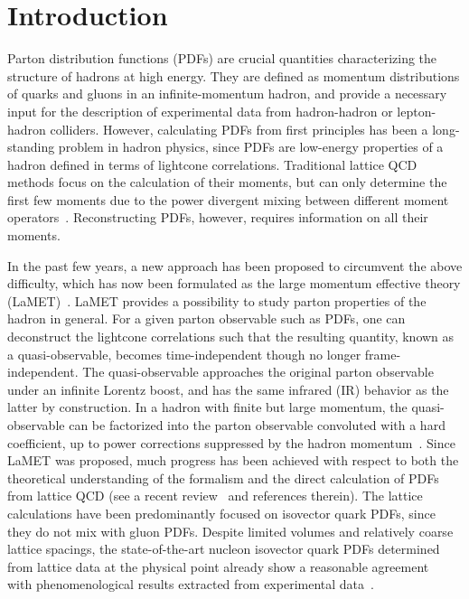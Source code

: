 \section{Introduction}\label{sec:intro}

Parton distribution functions (PDFs) are crucial quantities characterizing the structure of hadrons at high energy. They are defined as momentum distributions of quarks and gluons in an infinite-momentum hadron, and provide a necessary input for the description of experimental data from hadron-hadron or lepton-hadron colliders. However, calculating PDFs from first principles has been a long-standing problem in hadron physics, since PDFs are low-energy properties of a hadron defined in terms of lightcone correlations. Traditional lattice QCD methods focus on the calculation of their moments, but can only determine the first few moments due to the power divergent mixing between different moment operators~\cite{Martinelli:1987zd,Martinelli:1988xs,Detmold:2001dv,Dolgov:2002zm}. Reconstructing PDFs, however, requires information on all their moments.

In the past few years, a new approach has been proposed to circumvent the above difficulty, which has now been formulated as the large momentum effective theory (LaMET)~\cite{Ji:2013dva,Ji:2014gla}. LaMET provides a possibility to study parton properties of the hadron in general. For a given parton observable such as PDFs, one can deconstruct the lightcone correlations such that the resulting quantity, known as a quasi-observable, becomes time-independent though no longer frame-independent. The quasi-observable approaches the original parton observable under an infinite Lorentz boost, and has the same infrared (IR) behavior as the latter by construction. In a hadron with finite but large momentum, the quasi-observable can be factorized into the parton observable convoluted with a hard coefficient, up to power corrections suppressed by the hadron momentum~\cite{Ji:2013dva,Ji:2014gla,Xiong:2013bka,Ma:2017pxb,Izubuchi:2018srq,Ji:2015qla,Xiong:2015nua}.
Since LaMET was proposed, much progress has been achieved with respect to both the theoretical understanding of the formalism and the direct calculation of PDFs from lattice QCD (see a recent review~\cite{Cichy:2018mum} and references therein). The lattice calculations have been predominantly focused on isovector quark PDFs, since they do not mix with gluon PDFs. Despite limited volumes and relatively coarse lattice spacings, the state-of-the-art nucleon isovector quark PDFs determined from lattice data at the physical point already show a reasonable agreement~\cite{Chen:2018xof,Lin:2018qky,Alexandrou:2018pbm,Alexandrou:2018eet,Liu:2018hxv} with phenomenological results extracted from experimental data~\cite{Dulat:2015mca,Ball:2017nwa,Harland-Lang:2014zoa,Nocera:2014gqa,Ethier:2017zbq}.

